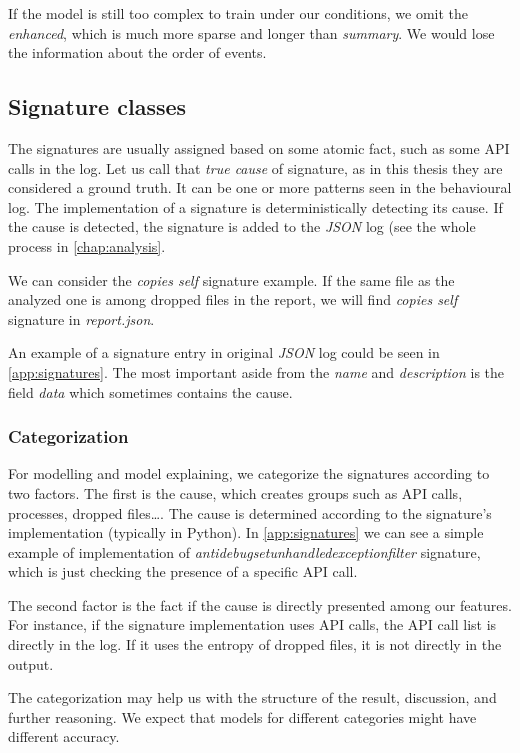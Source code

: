 If the model is still too complex to train under our conditions, we omit the \emph{enhanced}, which is much more sparse and longer than \emph{summary}. We would lose the information about the order of events.

\subsection{Signature classes}
The signatures are usually assigned based on some atomic fact, such as some API calls in the log. Let us call that \emph{true cause} of signature, as in this thesis they are considered a ground truth. It can be one or more patterns seen in the behavioural log. The implementation of a signature is deterministically detecting its cause. If the cause is detected, the signature is added to the \emph{JSON} log (see the whole process in \ref{chap:analysis}.

We can consider the \emph{copies self} signature example. If the same file as the analyzed one is among dropped files in the report, we will find \emph{copies self} signature in \emph{report.json}.

An example of a signature entry in original \emph{JSON} log could be seen in \ref{app:signatures}. The most important aside from the \emph{name} and \emph{description} is the field \emph{data} which sometimes contains the cause.

\subsubsection{Categorization}
For modelling and model explaining, we categorize the signatures according to two factors. The first is the cause, which creates groups such as API calls, processes, dropped files\dots. The cause is determined according to the signature's implementation (typically in Python). In \ref{app:signatures} we can see a simple example of implementation of \emph{antidebugsetunhandledexceptionfilter} signature, which is just checking the presence of a specific API call.

The second factor is the fact if the cause is directly presented among our features. For instance, if the signature implementation uses API calls, the API call list is directly in the log. If it uses the entropy of dropped files, it is not directly in the output.

The categorization may help us with the structure of the result, discussion, and further reasoning. We expect that models for different categories might have different accuracy.

